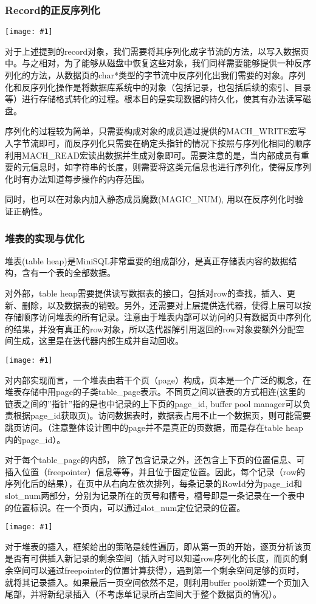\documentclass[12pt, a4paper]{article}
\def\sss#1{\subsubsection{#1}}
\def\p{\par}
\def\g#1{\begin{center}\texttt{[image: \#1]}\end{center}}
\begin{document}
\sss{Record的正反序列化}
\g{imgs/record_2.png}
\p 对于上述提到的record对象，我们需要将其序列化成字节流的方法，以写入数据页中。与之相对，为了能够从磁盘中恢复这些对象，我们同样需要能够提供一种反序列化的方法，从数据页的char*类型的字节流中反序列化出我们需要的对象。序列化和反序列化操作是将数据库系统中的对象（包括记录，也包括后续的索引、目录等）进行存储格式转化的过程。根本目的是实现数据的持久化，使其有办法读写磁盘。
\p 序列化的过程较为简单，只需要构成对象的成员通过提供的MACH\_WRITE宏写入字节流即可，而反序列化只需要在确定头指针的情况下按照与序列化相同的顺序利用MACH\_READ宏读出数据并生成对象即可。需要注意的是，当内部成员有重要的元信息时，如字符串的长度，则需要将这类元信息也进行序列化，使得反序列化时有办法知道每步操作的内存范围。
\p 同时，也可以在对象内加入静态成员魔数(MAGIC\_NUM), 用以在反序列化时验证正确性。
\sss{堆表的实现与优化}
\p 堆表(table heap)是MiniSQL非常重要的组成部分，是真正存储表内容的数据结构，含有一个表的全部数据。
\p 对外部，table heap需要提供读写数据表的接口，包括对row的查找，插入、更新、删除，以及数据表的销毁。另外，还需要对上层提供迭代器，使得上层可以按存储顺序访问堆表的所有记录。注意由于堆表内部可以访问的只有数据页中序列化的结果，并没有真正的row对象，所以迭代器解引用返回的row对象要额外分配空间生成，这里是在迭代器内部生成并自动回收。
\g{imgs/record_3.png}
\p 对内部实现而言，一个堆表由若干个页（page）构成，页本是一个广泛的概念，在堆表存储中用page的子类table\_page表示。不同页之间以链表的方式相连(这里的链表之间的”指针”指的是也中记录的上下页的page\_id,  buffer pool manager可以负责根据page\_id获取页)。访问数据表时，数据表占用不止一个数据页，则可能需要跳页访问。（注意整体设计图中的page并不是真正的页数据，而是存在table heap内的page\_id）。
\p 对于每个table\_page的内部， 除了包含记录之外，还包含上下页的位置信息、可插入位置（freepointer）信息等等，并且位于固定位置。因此，每个记录（row的序列化后的结果），在页中从右向左依次排列，每条记录的RowId分为page\_id和slot\_num两部分，分别为记录所在的页号和槽号，槽号即是一条记录在一个表中的位置标识。在一个页内，可以通过slot\_num定位记录的位置。
\g{imgs/record_4.png}
\p 对于堆表的插入，框架给出的策略是线性遍历，即从第一页的开始，逐页分析该页是否有可供插入新记录的剩余空间（插入时可以知道row序列化的长度，而页的剩余空间可以通过freepointer的位置计算获得），遇到第一个剩余空间足够的页时，就将其记录插入。如果最后一页空间依然不足，则利用buffer pool新建一个页加入尾部，并将新纪录插入（不考虑单记录所占空间大于整个数据页的情况）。
\end{document}
